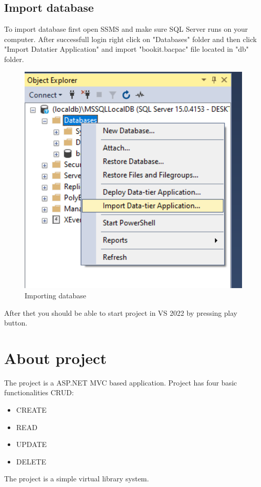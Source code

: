 \documentclass[a4paper,12pt,oneside]{article}
\begin{document}
	\newpage
	
	\subsection{Import database}
	To import database first open SSMS and make sure SQL Server runs on your computer. After successfull login right click on "Databases" folder and then click "Import Datatier Application" and import "bookit.bacpac" file located in "db" folder.
	
	\begin{figure}[h]
		\centering
		\includegraphics[width=1\textwidth]{img/import}
		\caption{Importing database}
	\end{figure}

	\setlength{\parindent}{0pt}After thet you should be able to start project in VS 2022 by pressing play button.
	\newpage
	
	\section{About project}
	The project is a ASP.NET MVC based application. Project has four basic functionalities CRUD:
	\begin{itemize}
		\item  CREATE
		\item  READ
		\item  UPDATE
		\item  DELETE
	\end{itemize}
	The project is a simple virtual library system.
	
\end{document}
